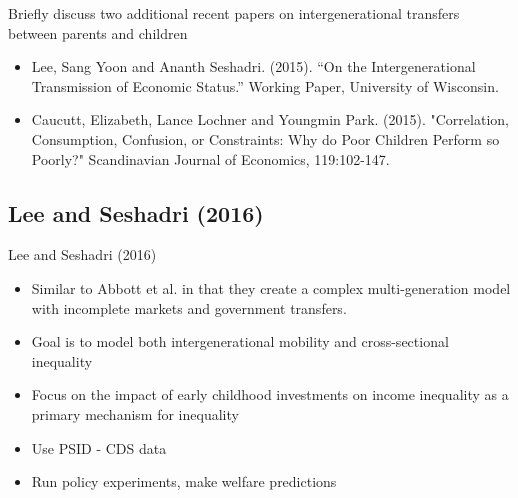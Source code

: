 \documentclass{beamer}
\begin{document}

\begin{frame}
Briefly discuss two additional recent papers on intergenerational transfers between parents and children 
\begin{itemize}
\item  Lee, Sang Yoon and  Ananth Seshadri. (2015). ``On the Intergenerational Transmission of Economic Status.'' Working Paper, University of Wisconsin. 
\item Caucutt, Elizabeth, Lance Lochner and Youngmin Park. (2015). "Correlation, Consumption, Confusion, or Constraints: Why do Poor Children Perform so Poorly?" Scandinavian Journal of Economics, 119:102-147.
\end{itemize}
\end{frame}


\subsection{Lee and Seshadri (2016)} 

\begin{frame}{Lee and Seshadri (2016)}
\begin{itemize}
\item Similar to Abbott et al. in that they create a complex multi-generation model with incomplete markets and government transfers.
\item Goal is to model both intergenerational mobility and cross-sectional inequality
\item Focus on the impact of early childhood investments on income inequality as a primary mechanism for inequality
\item Use PSID - CDS data
\item Run policy experiments, make welfare predictions
\end{itemize}
\end{frame}
\end{document}
